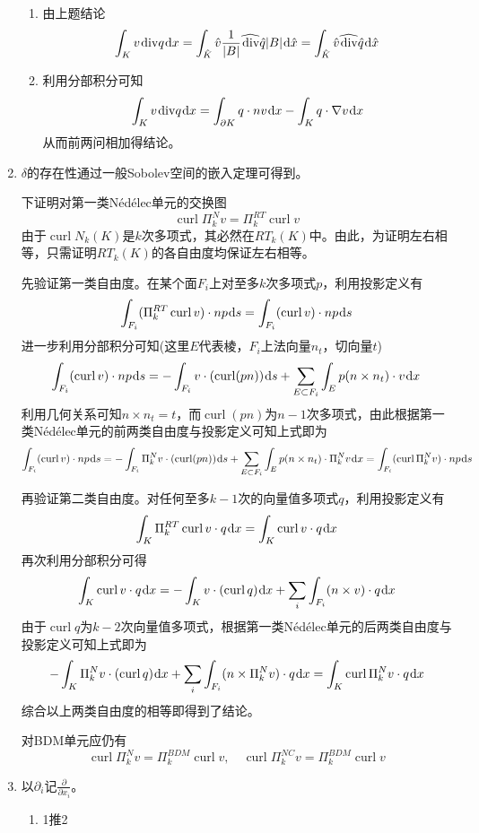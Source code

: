 \documentclass[a4paper,UTF8,fontset=windows,10pt]{ctexart}
\renewcommand{\div}{\hspace{0.09em}\mathrm{div}}
\newcommand*{\dr}{\hspace{0.07em}\mathrm{d}}
\DeclareMathOperator*{\curl}{curl}
\begin{document}
\begin{enumerate}
\begin{enumerate}[(1)]
        \item 由上题结论
        $$\int_Kv\div q\dr x=\int_{\hat{K}}\hat{v}\frac{1}{|B|}\widehat{\div}\hat{q}|B|\dr\hat{x}=\int_{\hat{K}}\hat{v}\widehat{\div}\hat{q}\dr\hat{x}$$

        \item 利用分部积分可知
        $$\int_Kv\div q\dr x=\int_{\partial K}q\cdot nv\dr x-\int_Kq\cdot\nabla v\dr x$$
        从而前两问相加得结论。
    \end{enumerate}

    \item 
    $\delta$的存在性通过一般Sobolev空间的嵌入定理可得到。

    下证明对第一类N\'ed\'elec单元的交换图
    $$\curl\Pi_k^Nv=\Pi_k^{RT}\curl v$$
    由于$\curl N_k(K)$是$k$次多项式，其必然在$RT_k(K)$中。由此，为证明左右相等，只需证明$RT_k(K)$的各自由度均保证左右相等。

    先验证第一类自由度。在某个面$F_i$上对至多$k$次多项式$p$，利用投影定义有
    $$\int_{F_i}(\Pi_k^{RT}\curl v)\cdot np\dr s=\int_{F_i}(\curl v)\cdot np\dr s$$
    进一步利用分部积分可知(这里$E$代表棱，$F_i$上法向量$n_t$，切向量$t$)
    $$\int_{F_i}(\curl v)\cdot np\dr s=-\int_{F_i}v\cdot(\curl(pn))\dr s+\sum_{E\subset F_i}\int_Ep(n\times n_t)\cdot v\dr x$$
    利用几何关系可知$n\times n_t=t$，而$\curl(pn)$为$n-1$次多项式，由此根据第一类N\'ed\'elec单元的前两类自由度与投影定义可知上式即为
    $$\int_{F_i}(\curl v)\cdot np\dr s=-\int_{F_i}\Pi_k^Nv\cdot(\curl(pn))\dr s+\sum_{E\subset F_i}\int_Ep(n\times n_t)\cdot\Pi_k^Nv\dr x=\int_{F_i}(\curl\Pi_k^Nv)\cdot np\dr s$$

    再验证第二类自由度。对任何至多$k-1$次的向量值多项式$q$，利用投影定义有
    $$\int_K\Pi_k^{RT}\curl v\cdot q\dr x=\int_K\curl v\cdot q\dr x$$
    再次利用分部积分可得
    $$\int_K\curl v\cdot q\dr x=-\int_Kv\cdot(\curl q)\dr x+\sum_i\int_{F_i}(n\times v)\cdot q\dr x$$
    由于$\curl q$为$k-2$次向量值多项式，根据第一类N\'ed\'elec单元的后两类自由度与投影定义可知上式即为
    $$-\int_K\Pi_k^Nv\cdot(\curl q)\dr x+\sum_i\int_{F_i}(n\times \Pi_k^Nv)\cdot q\dr x=\int_K\curl\Pi_k^Nv\cdot q\dr x$$
    综合以上两类自由度的相等即得到了结论。
    
    对BDM单元应仍有
    $$\curl\Pi_k^Nv=\Pi_k^{BDM}\curl v,\quad\curl\Pi_k^{NC}v=\Pi_k^{BDM}\curl v$$

    \item
    以$\partial_i$记$\frac{\partial}{\partial x_i}$。
    \begin{enumerate}[(1)]
        \item 1推2
        

\end{enumerate}
\end{enumerate}
\end{document}
